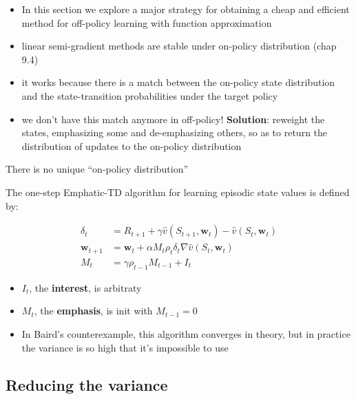 \documentclass[sutton_barto_notes.tex]{subfiles}
\begin{document}
\begin{itemize}
\item In this section we explore a major strategy for obtaining a cheap and efficient method for off-policy learning with function approximation 
\item linear semi-gradient methods are stable under on-policy distribution (chap 9.4)
\item it works because there is a match between the on-policy state distribution and the state-transition probabilities under the target policy 
\item we don’t have this match anymore in off-policy! 
\textbf{Solution}: reweight the states, emphasizing some and de-emphasizing others, so as to return the distribution of updates to the on-policy distribution 
\end{itemize}

 There is no unique “on-policy distribution” 

 The one-step Emphatic-TD algorithm for learning episodic state values is defined by: 

 
\begin{align}
\delta_t & = R_{t+1} + \gamma \hat{v}(S_{t+1}, \mathbf{w}_t) - \hat{v}(S_t, \mathbf{w}_t) \label{eq:11.37}\tag{11.37}\\
\mathbf{w}_{t+1} & = \mathbf{w}_t + \alpha M_t \rho_t \delta_t \nabla \hat{v}(S_t, \mathbf{w}_t) \label{eq:11.38}\tag{11.38}\\
M_t & = \gamma \rho_{t-1} M_{t-1} + I_t \label{eq:11.39}\tag{11.39}
\end{align} 

\begin{itemize}
\item $I_t$, the \textbf{interest}, is arbitraty 
\item $M_t$, the \textbf{emphasis}, is init with $M_{t-1} = 0$ 
\item In Baird’s counterexample, this algorithm converges in theory, but in practice the variance is so high that it’s impossible to use 
\end{itemize}

\subsection{Reducing the variance}
\end{document}
